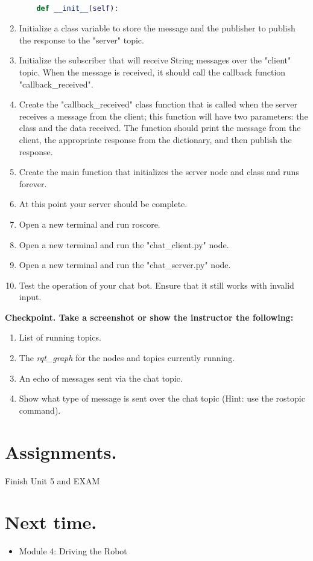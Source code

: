\documentclass{handout}
\begin{document}
\begin{enumerate}
\begin{lstlisting}[language=python]
    
    def __init__(self):
\end{lstlisting}
	\item Initialize a class variable to store the message and the publisher to publish the response to the "server" topic.
	\item Initialize the subscriber that will receive String messages over the "client" topic. When the message is received, it should call the callback function "callback\_received".
	\item Create the "callback\_received" class function that is called when the server receives a message from the client; this function will have two parameters: the class and the data received. The function should print the message from the client, the appropriate response from the dictionary, and then publish the response.
	\item Create the main function that initializes the server node and class and runs forever.
	\item At this point your server should be complete.
	\item Open a new terminal and run roscore.
	\item Open a new terminal and run the "chat\_client.py" node.
	\item Open a new terminal and run the "chat\_server.py" node.
	\item Test the operation of your chat bot. Ensure that it still works with invalid input.
\end{enumerate}

\textbf{Checkpoint. Take a screenshot or show the instructor the following:}
\begin{enumerate}
	\item List of running topics.
	\item The \textit{rqt\_graph} for the nodes and topics currently running.
	\item An echo of messages sent via the chat topic.
	\item Show what type of message is sent over the chat topic (Hint: use the rostopic command).
\end{enumerate}

\section{Assignments.}
	\begin{todolist}
		\item Finish Unit 5 and EXAM
	\end{todolist}

\section{Next time.}
	\begin{itemize}
		\item Module 4: Driving the Robot
	\end{itemize}
\end{document}
